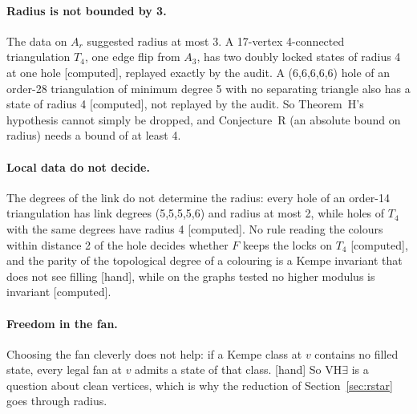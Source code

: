 \documentclass[11pt]{article}
\newcommand{\lab}[1]{\textsf{[#1]}}
\begin{document}
\paragraph{Radius is not bounded by 3.} The data on $A_r$ suggested radius at most 3. A 17-vertex 4-connected triangulation $T_4$, one edge flip from $A_3$, has two doubly locked states of radius 4 at one hole \lab{computed}, replayed exactly by the audit. A (6,6,6,6,6) hole of an order-28 triangulation of minimum degree 5 with no separating triangle also has a state of radius 4 \lab{computed}, not replayed by the audit. So Theorem~H's hypothesis cannot simply be dropped, and Conjecture~R (an absolute bound on radius) needs a bound of at least 4.

\paragraph{Local data do not decide.} The degrees of the link do not determine the radius: every hole of an order-14 triangulation has link degrees (5,5,5,5,6) and radius at most 2, while holes of $T_4$ with the same degrees have radius 4 \lab{computed}. No rule reading the colours within distance 2 of the hole decides whether $F$ keeps the locks on $T_4$ \lab{computed}, and the parity of the topological degree of a colouring is a Kempe invariant that does not see filling \lab{hand}, while on the graphs tested no higher modulus is invariant \lab{computed}.

\paragraph{Freedom in the fan.} Choosing the fan cleverly does not help: if a Kempe class at $v$ contains no filled state, every legal fan at $v$ admits a state of that class. \lab{hand} So VH$\exists$ is a question about clean vertices, which is why the reduction of Section~\ref{sec:rstar} goes through radius.
\end{document}
